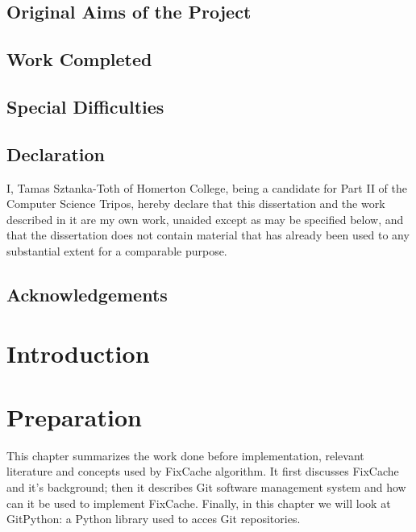 \documentclass[12pt,twoside,notitlepage]{report}
\newcommand{\fxch}{FixCache}
\begin{document}
\section*{Original Aims of the Project}


\section*{Work Completed}

\section*{Special Difficulties}
 
\newpage
\section*{Declaration}

I, Tamas Sztanka-Toth of Homerton College, being a candidate for Part II of the Computer
Science Tripos, hereby declare
that this dissertation and the work described in it are my own work,
unaided except as may be specified below, and that the dissertation
does not contain material that has already been used to any substantial
extent for a comparable purpose.

\bigskip
{}

\medskip
{}

\cleardoublepage

\tableofcontents

\listoffigures

\newpage
\section*{Acknowledgements}



\cleardoublepage        %
\setcounter{page}{1}
\pagestyle{headings}
\chapter{Introduction}
\cleardoublepage
\chapter{Preparation}
This chapter summarizes the work done before implementation, relevant literature and concepts used by \fxch{} algorithm. It first discusses \fxch{} and it's background; then it describes Git\cite{TorvaldsGit} software management system and how can it be used to implement \fxch{}. Finally, in this chapter we will look at GitPython: a Python library used to acces Git repositories.
\end{document}
